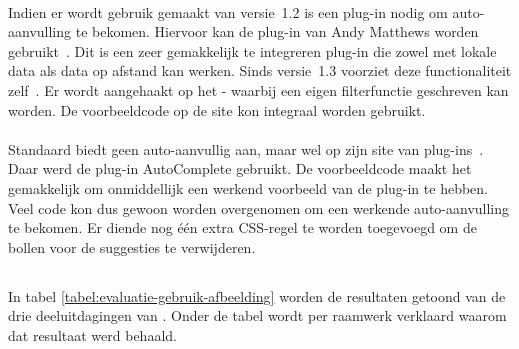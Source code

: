\paragraph{\jqm}
Indien er wordt gebruik gemaakt van versie~1.2 is een plug-in nodig om auto-aanvulling te bekomen.
Hiervoor kan de plug-in van Andy Matthews worden gebruikt~\cite{Matthews2013}. 
Dit is een zeer gemakkelijk te integreren plug-in die zowel met lokale data als data op afstand kan werken.
Sinds versie~1.3 voorziet \jqm{} deze functionaliteit zelf~\cite{JQuery2013c}.
Er wordt aangehaakt op het - waarbij een eigen filterfunctie geschreven kan worden.
De voorbeeldcode op de site kon integraal worden gebruikt. 

\paragraph{\lungo}
Standaard biedt \lungo{} geen auto-aanvullig aan, maar wel op zijn site van plug-ins~\cite{TapQuo2013b}.
Daar werd de plug-in AutoComplete gebruikt.
De voorbeeldcode maakt het gemakkelijk om onmiddellijk een werkend voorbeeld van de plug-in te hebben.
Veel code kon dus gewoon worden overgenomen om een werkende auto-aanvulling te bekomen.
Er diende nog één extra CSS-regel te worden toegevoegd om de bollen voor de suggesties te verwijderen.


\subsection{}
\label{sec:evaluatie-gebruik-afbeelding}

In tabel \ref{tabel:evaluatie-gebruik-afbeelding} worden de resultaten getoond van de drie deeluitdagingen van .
Onder de tabel wordt per raamwerk verklaard waarom dat resultaat werd behaald.

\begin{table}[H]
\centering
{}
\caption{Gebruik van  voor \st{}~(\sta), \kendo{}~(\kendoa), \jqm{}~(\jqma) en \lungo{}~(\lungoa).}
\label{tabel:evaluatie-gebruik-afbeelding}
\end{table}


